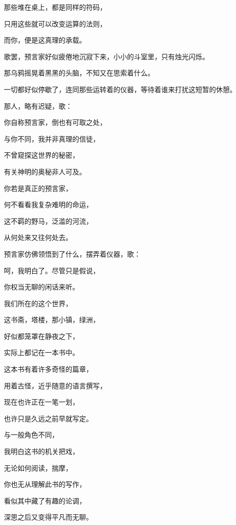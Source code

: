 \documentclass[UTF8]{article}
\begin{document}
\par 那些堆在桌上，都是同样的符码，
\par 只用这些就可以改变运算的法则，
\par 而你，便是这真理的承载。
\\[0.6cm]
\par 歌罢，预言家好似疲倦地沉寂下来，小小的斗室里，只有烛光闪烁。
\par 那乌鸦摇晃着黑黑的头脑，不知又在思索着什么。
\par 一切都好似停歇了，连同那些运转着的仪器，等待着谁来打扰这短暂的休憩。
\\[0.6cm]
\par 那人，略有迟疑，歌：
\\[0.6cm]
\par 你自称预言家，倒也有可取之处，
\par 与你不同，我并非真理的信徒，
\par 不曾窥探这世界的秘密，
\par 有关神明的奥秘非人可及。
\par 你若是真正的预言家，
\par 何不看看我复杂难明的命运，
\par 这不羁的野马，泛滥的河流，
\par 从何处来又往何处去。
\\[0.6cm]
\par 预言家仿佛领悟到了什么，摆弄着仪器，歌：
\\[0.6cm]
\par 呵，我明白了。尽管只是假说，
\par 你权当无聊的闲话来听。
\par 我们所在的这个世界，
\par 这书斋，塔楼，那小镇，绿洲，
\par 好似都笼罩在静夜之下，
\par 实际上都记在一本书中。
\par 这本书有着许多奇怪的篇章，
\par 用着古怪，近乎随意的语言撰写，
\par 现在也许正在一笔一划，
\par 也许只是久远之前早就写定。
\par 与一般角色不同，
\par 我明白这书的机关把戏，
\par 无论如何阅读，揣摩，
\par 你也无从理解此书的写作，
\par 看似其中藏了有趣的论调，
\par 深思之后又变得平凡而无聊。
\end{document}
